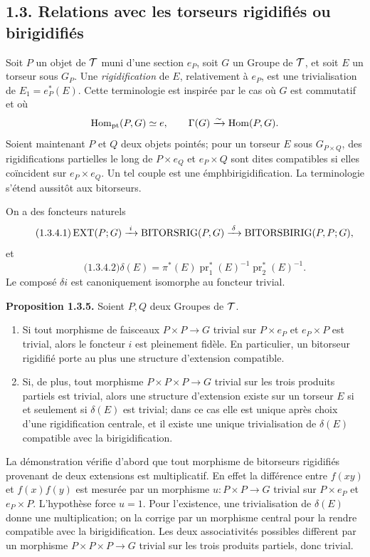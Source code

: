 \documentclass[11pt]{article}
\providecommand{\pr}{\operatorname{pr}}
\begin{document}
\subsection*{1.3. Relations avec les torseurs rigidifiés ou birigidifiés}

Soit \(P\) un objet de \(\mathcal T\) muni d'une section \(e_P\), soit \(G\) un Groupe de \(\mathcal T\), et soit \(E\) un torseur sous \(G_P\).  Une \emph{rigidification} de \(E\), relativement à \(e_P\), est une trivialisation de \(E_1=e_P^*(E)\).  Cette terminologie est inspirée par le cas où \(G\) est commutatif et où
\[
  \operatorname{Hom}_{\mathrm{pt}}(P,G)\simeq e,\qquad
  \Gamma(G)\xrightarrow{\sim}\operatorname{Hom}(P,G).
\]
Soient maintenant \(P\) et \(Q\) deux objets pointés; pour un torseur \(E\) sous \(G_{P\times Q}\), des rigidifications partielles le long de \(P\times e_Q\) et \(e_P\times Q\) sont dites compatibles si elles coïncident sur \(e_P\times e_Q\).  Un tel couple est une émph{birigidification}.  La terminologie s'étend aussitôt aux bitorseurs.

On a des foncteurs naturels
\begin{equation}\qquad\text{(1.3.4.1)}
  \operatorname{EXT}(P;G)\xrightarrow{\;i\;}\operatorname{BITORSRIG}(P,G)
  \xrightarrow{\;\delta\;}\operatorname{BITORSBIRIG}(P,P;G),
\end{equation}
et
\begin{equation}\qquad\text{(1.3.4.2)}
  \delta(E)=\pi^*(E)\pr_1^*(E)^{-1}\pr_2^*(E)^{-1}.
\end{equation}
Le composé \(\delta i\) est canoniquement isomorphe au foncteur trivial.

\textbf{Proposition 1.3.5.}  Soient \(P,Q\) deux Groupes de \(\mathcal T\).
\begin{enumerate}[label=\alph*)]
\item Si tout morphisme de faisceaux \(P\times P\to G\) trivial sur \(P\times e_P\) et \(e_P\times P\) est trivial, alors le foncteur \(i\) est pleinement fidèle.  En particulier, un bitorseur rigidifié porte au plus une structure d'extension compatible.
\item Si, de plus, tout morphisme \(P\times P\times P\to G\) trivial sur les trois produits partiels est trivial, alors une structure d'extension existe sur un torseur \(E\) si et seulement si \(\delta(E)\) est trivial; dans ce cas elle est unique après choix d'une rigidification centrale, et il existe une unique trivialisation de \(\delta(E)\) compatible avec la birigidification.
\end{enumerate}

La démonstration vérifie d'abord que tout morphisme de bitorseurs rigidifiés provenant de deux extensions est multiplicatif.  En effet la différence entre \(f(xy)\) et \(f(x)f(y)\) est mesurée par un morphisme \(u:P\times P\to G\) trivial sur \(P\times e_P\) et \(e_P\times P\).  L'hypothèse force \(u=1\).  Pour l'existence, une trivialisation de \(\delta(E)\) donne une multiplication; on la corrige par un morphisme central pour la rendre compatible avec la birigidification.  Les deux associativités possibles diffèrent par un morphisme \(P\times P\times P\to G\) trivial sur les trois produits partiels, donc trivial.
\end{document}
